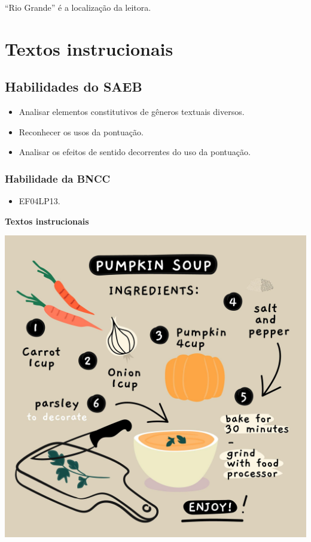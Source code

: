\begin{conteudo}
\begin{conteudo}
\begin{escolha}
\item ``Rio Grande'' é a localização da leitora.
\end{escolha}


\chapter{Textos instrucionais}

\vspace*{-1cm}\enlargethispage{\baselineskip}

\section*{Habilidades do SAEB}

\begin{itemize}
\item Analisar elementos constitutivos de gêneros textuais diversos.

\item Reconhecer os usos da pontuação.

\item Analisar os efeitos de sentido decorrentes do uso da pontuação.
\end{itemize}

\subsection{Habilidade da BNCC}

\begin{itemize}
	\item 
EF04LP13.
\end{itemize}

\begin{conteudo}{\textbf{Textos instrucionais}\\%

\begin{center}
\includegraphics[width=.7\textwidth]{media/image9a.jpeg}
\end{center}\\%

}
\end{conteudo}
\end{conteudo}
\end{conteudo}
